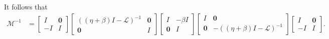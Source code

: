 \documentclass[a4paper,10pt]{article}
\begin{document}
%
It follows that
%
\begin{align}\label{eq:presb_inv}
\mathcal{M}^{-1} & = 
	\begin{bmatrix} I & \mathbf{0} \\ -I & I \end{bmatrix}
	\begin{bmatrix} ((\eta+\beta)I - \mathcal{L})^{-1} & \mathbf{0} \\
		\mathbf{0} & I \end{bmatrix}
	\begin{bmatrix} I & -\beta I \\ \mathbf{0} & I \end{bmatrix}
	\begin{bmatrix} I & \mathbf{0} \\
		\mathbf{0} & -((\eta+\beta)I - \mathcal{L})^{-1} \end{bmatrix}
	\begin{bmatrix} I & \mathbf{0} \\ -I & I \end{bmatrix}.
\end{align}
%
\end{document}
